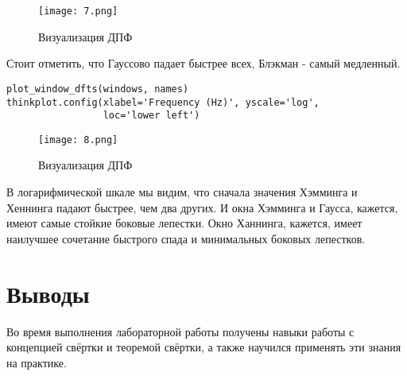 \documentclass[a4paper,12pt]{report}
\begin{document}
\begin{figure}[H]
        \centering
        \texttt{[image: 7.png]}
        \caption{Визуализация ДПФ}
        \label{fig:lab8_fig3_2}
\end{figure}

Стоит отметить, что Гауссово падает быстрее всех, Блэкман - самый медленный.

\begin{lstlisting}[caption=Визуализация ДПФ]
plot_window_dfts(windows, names)
thinkplot.config(xlabel='Frequency (Hz)', yscale='log', 
                 loc='lower left')
\end{lstlisting}

\begin{figure}[H]
        \centering
        \texttt{[image: 8.png]}
        \caption{Визуализация ДПФ}
        \label{fig:lab8_fig3_3}
\end{figure}

В логарифмической шкале мы видим, что сначала значения Хэмминга и Хеннинга падают быстрее, чем два других. И окна Хэмминга и Гаусса, кажется, имеют самые стойкие боковые лепестки. Окно Ханнинга, кажется, имеет наилучшее сочетание быстрого спада и минимальных боковых лепестков.

\chapter{Выводы}

Во время выполнения лабораторной работы получены навыки работы с концепцией свёртки и теоремой свёртки, а также научился применять эти знания на практике.
\end{document}
